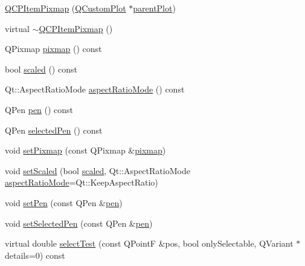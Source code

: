 \begin{DoxyCompactItemize}
\item 
\hyperlink{class_q_c_p_item_pixmap_aa6de42a37261b21a5480e7da122345c3}{Q\-C\-P\-Item\-Pixmap} (\hyperlink{class_q_custom_plot}{Q\-Custom\-Plot} $\ast$\hyperlink{class_q_c_p_layerable_ab7e0e94461566093d36ffc0f5312b109}{parent\-Plot})
\item 
virtual \hyperlink{class_q_c_p_item_pixmap_a810cac6a409d963cda6ea2d3152f1fd0}{$\sim$\-Q\-C\-P\-Item\-Pixmap} ()
\item 
Q\-Pixmap \hyperlink{class_q_c_p_item_pixmap_a73dea89e0eb45127a2705e2c7991b8d8}{pixmap} () const 
\item 
bool \hyperlink{class_q_c_p_item_pixmap_a54026b89dff3c60376c2360f01b6fb83}{scaled} () const 
\item 
Qt\-::\-Aspect\-Ratio\-Mode \hyperlink{class_q_c_p_item_pixmap_ac5b95c097169e107a61eebbb7c77523c}{aspect\-Ratio\-Mode} () const 
\item 
Q\-Pen \hyperlink{class_q_c_p_item_pixmap_ab2b821c80cfade589472e933b9c4361f}{pen} () const 
\item 
Q\-Pen \hyperlink{class_q_c_p_item_pixmap_af8e839d7c7b84e214608feda3caec2bc}{selected\-Pen} () const 
\item 
void \hyperlink{class_q_c_p_item_pixmap_a726b69ea4025edf48f9b29b6450548a7}{set\-Pixmap} (const Q\-Pixmap \&\hyperlink{class_q_c_p_item_pixmap_a73dea89e0eb45127a2705e2c7991b8d8}{pixmap})
\item 
void \hyperlink{class_q_c_p_item_pixmap_aea813ff1b12163ae5d3ac182593b1d6f}{set\-Scaled} (bool \hyperlink{class_q_c_p_item_pixmap_a54026b89dff3c60376c2360f01b6fb83}{scaled}, Qt\-::\-Aspect\-Ratio\-Mode \hyperlink{class_q_c_p_item_pixmap_ac5b95c097169e107a61eebbb7c77523c}{aspect\-Ratio\-Mode}=Qt\-::\-Keep\-Aspect\-Ratio)
\item 
void \hyperlink{class_q_c_p_item_pixmap_acdade1305edb4b5cae14f97fd132065f}{set\-Pen} (const Q\-Pen \&\hyperlink{class_q_c_p_item_pixmap_ab2b821c80cfade589472e933b9c4361f}{pen})
\item 
void \hyperlink{class_q_c_p_item_pixmap_afc5e479e88e53740176ce77cb70dd67a}{set\-Selected\-Pen} (const Q\-Pen \&\hyperlink{class_q_c_p_item_pixmap_ab2b821c80cfade589472e933b9c4361f}{pen})
\item 
virtual double \hyperlink{class_q_c_p_item_pixmap_a9f8436aa141fa0fb504191c882c2f4d9}{select\-Test} (const Q\-Point\-F \&pos, bool only\-Selectable, Q\-Variant $\ast$details=0) const 
\end{DoxyCompactItemize}
